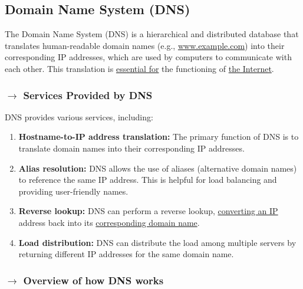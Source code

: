 \clearpage
\subsection[2.4 Domain Name System (DNS)]{\hspace*{0.075 em}\raisebox{0.2 em}{$\pmb{\drsh}$} Domain Name System (DNS)}
\label{subsec:dns}

The Domain Name System (DNS) is a hierarchical and distributed database that translates human-readable domain names (e.g., \url{www.example.com}) into their corresponding IP addresses, which are used by computers to communicate with each other. This translation is \underline{essential for} the functioning of \underline{the Internet}.

\subsubsection[2.4.1 Services Provided by DNS]{$\pmb{\rightarrow}$ Services Provided by DNS}

DNS provides various services, including:

\vspace{-0.5em}
\begin{enumerate}
    \item \textbf{Hostname-to-IP address translation:} The primary function of DNS is to translate domain names into their corresponding IP addresses.
    \item \textbf{Alias resolution:} DNS allows the use of aliases (alternative domain names) to reference the same IP address. This is helpful for load balancing and providing user-friendly names.
    \item \textbf{Reverse lookup:} DNS can perform a reverse lookup, \underline{converting an IP} address back into its \underline{corresponding domain name}.
    \item \textbf{Load distribution:} DNS can distribute the load among multiple servers by returning different IP addresses for the same domain name.
\end{enumerate}

\subsubsection[2.4.2 Overview of how DNS works]{$\pmb{\rightarrow}$ Overview of how DNS works}

